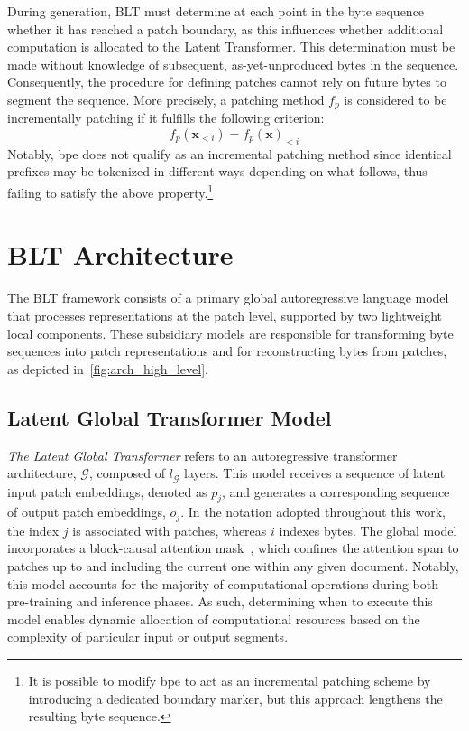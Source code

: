 During generation, {\textsc BLT} must determine at each point in the byte sequence whether it has reached a patch boundary, as this influences whether additional computation is allocated to the Latent Transformer. This determination must be made without knowledge of subsequent, as-yet-unproduced bytes in the sequence. Consequently, the procedure for defining patches cannot rely on future bytes to segment the sequence. More precisely, a patching method $f_p$ is considered to be incrementally patching if it fulfills the following criterion:
$$f_p(\pmb{x}_{<i}) = f_p(\pmb{x})_{<i}$$
Notably, bpe does not qualify as an incremental patching method since identical prefixes may be tokenized in different ways depending on what follows, thus failing to satisfy the above property.\footnote{It is possible to modify bpe to act as an incremental patching scheme by introducing a dedicated boundary marker, but this approach lengthens the resulting byte sequence.}

\section{{\textsc BLT} Architecture}
\label{section:architecture}
The {\textsc BLT} framework consists of a primary global autoregressive language model that processes representations at the patch level, supported by two lightweight local components. These subsidiary models are responsible for transforming byte sequences into patch representations and for reconstructing bytes from patches, as depicted in~\autoref{fig:arch_high_level}.

\subsection{Latent Global Transformer Model}

\textit{The Latent Global Transformer} refers to an autoregressive transformer architecture, $\mathcal{G}$, composed of $l_{\mathcal{G}}$ layers. This model receives a sequence of latent input patch embeddings, denoted as $p_j$, and generates a corresponding sequence of output patch embeddings, $o_j$. In the notation adopted throughout this work, the index $j$ is associated with patches, whereas $i$ indexes bytes. The global model incorporates a block-causal attention mask~\citep{dubey2024llama}, which confines the attention span to patches up to and including the current one within any given document. Notably, this model accounts for the majority of computational operations during both pre-training and inference phases. As such, determining when to execute this model enables dynamic allocation of computational resources based on the complexity of particular input or output segments.

